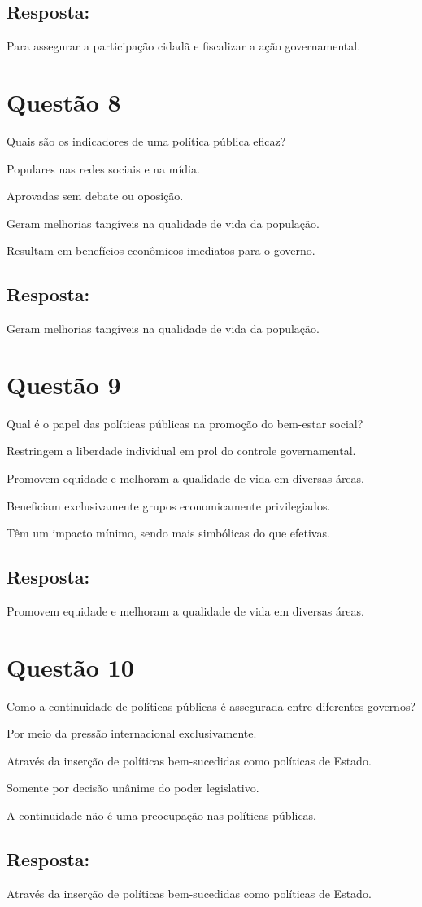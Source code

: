 \documentclass[
   article,       
   12pt,          
   oneside,       
   a4paper,       
   english,       
   brazil,        
   sumario=tradicional
   ]{abntex2}
\begin{document}
\subsection{Resposta:}
Para assegurar a participação cidadã e fiscalizar a ação governamental.
\section{Questão 8}
Quais são os indicadores de uma política pública eficaz?
\itemize
    \item Populares nas redes sociais e na mídia.
    \item Aprovadas sem debate ou oposição.
    \item Geram melhorias tangíveis na qualidade de vida da população.
    \item Resultam em benefícios econômicos imediatos para o governo.
\subsection{Resposta:}
Geram melhorias tangíveis na qualidade de vida da população.
\section{Questão 9}
Qual é o papel das políticas públicas na promoção do bem-estar social?
\itemize
    \item Restringem a liberdade individual em prol do controle governamental.
    \item Promovem equidade e melhoram a qualidade de vida em diversas áreas.
    \item Beneficiam exclusivamente grupos economicamente privilegiados.
    \item Têm um impacto mínimo, sendo mais simbólicas do que efetivas.
\subsection{Resposta:}
Promovem equidade e melhoram a qualidade de vida em diversas áreas.
\section{Questão 10}
Como a continuidade de políticas públicas é assegurada entre diferentes governos?
\itemize
    \item Por meio da pressão internacional exclusivamente.
    \item Através da inserção de políticas bem-sucedidas como políticas de Estado.
    \item Somente por decisão unânime do poder legislativo.
    \item A continuidade não é uma preocupação nas políticas públicas.
\subsection{Resposta:}
Através da inserção de políticas bem-sucedidas como políticas de Estado.

\postextual

\end{document}
